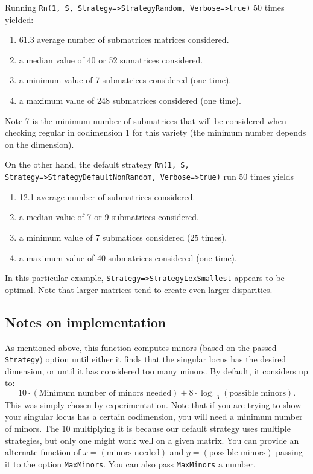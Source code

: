 \documentclass[11pt]{amsart}
\begin{document}
Running {\tt Rn(1, S, Strategy=>StrategyRandom, Verbose=>true)} 50 times yielded:
\begin{enumerate}
  \item 61.3 average number of submatrices matrices considered.
  \item a median value of 40 or 52 sumatrices considered.
  \item a minimum value of 7 submatrices considered (one time).
  \item a maximum value of 248 submatrices considered (one time).
\end{enumerate}
Note 7 is the minimum number of submatrices that will be considered when checking regular in codimension 1 for this variety (the minimum number depends on the dimension).

On the other hand, the default strategy {\tt Rn(1, S, Strategy=>StrategyDefaultNonRandom, Verbose=>true)} run 50 times yields
\begin{enumerate}
  \item 12.1 average number of submatrices considered.
  \item a median value of 7 or 9 submatrices considered.
  \item a minimum value of 7 submatices considered (25 times).
  \item a maximum value of 40 submatrices considered (one time).
\end{enumerate}

In this particular example, {\tt Strategy=>StrategyLexSmallest} appears to be optimal.  Note that larger matrices tend to create even larger disparities.

\subsection{Notes on implementation}

As mentioned above, this function computes minors (based on the passed {\tt Strategy}) option until either it finds that the singular locus has the desired dimension, or until it has considered too many minors.  By default, it considers up to:
\[
  10\cdot (\text{Minimum number of minors needed}) + 8 \cdot \log_{1.3}(\text{possible minors}).
\]
This was simply chosen by experimentation.
Note that if you are trying to show your singular locus has a certain codimension, you will need a minimum number of minors.  The 10 multiplying it is because our default strategy uses multiple strategies, but only one might work well on a given matrix.  You can provide an alternate function of $x = (\text{minors needed})$ and $y = (\text{possible minors})$ passing it to the option {\tt MaxMinors}.  You can also pass {\tt MaxMinors} a number.
\end{document}
